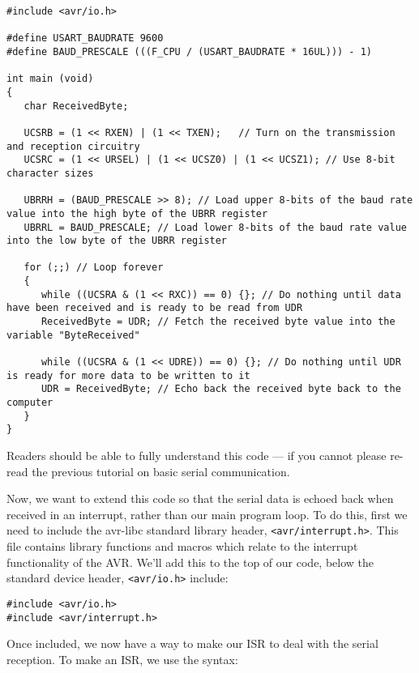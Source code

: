 \documentclass[a4paper,oneside,notitlepage]{book}
\begin{document}
\begin{center}
\begin{lstlisting}
#include <avr/io.h>

#define USART_BAUDRATE 9600
#define BAUD_PRESCALE (((F_CPU / (USART_BAUDRATE * 16UL))) - 1)

int main (void)
{
   char ReceivedByte;

   UCSRB = (1 << RXEN) | (1 << TXEN);   // Turn on the transmission and reception circuitry
   UCSRC = (1 << URSEL) | (1 << UCSZ0) | (1 << UCSZ1); // Use 8-bit character sizes

   UBRRH = (BAUD_PRESCALE >> 8); // Load upper 8-bits of the baud rate value into the high byte of the UBRR register
   UBRRL = BAUD_PRESCALE; // Load lower 8-bits of the baud rate value into the low byte of the UBRR register

   for (;;) // Loop forever
   {
      while ((UCSRA & (1 << RXC)) == 0) {}; // Do nothing until data have been received and is ready to be read from UDR
      ReceivedByte = UDR; // Fetch the received byte value into the variable "ByteReceived"

      while ((UCSRA & (1 << UDRE)) == 0) {}; // Do nothing until UDR is ready for more data to be written to it
      UDR = ReceivedByte; // Echo back the received byte back to the computer
   }
}
\end{lstlisting}
\end{center}

Readers should be able to fully understand this code --- if you cannot please re-read the previous tutorial on basic serial communication.

Now, we want to extend this code so that the serial data is echoed back when received in an interrupt, rather than our main program loop. To do this, first we need to include the avr-libc standard library header, \texttt{<avr/interrupt.h>}. This file contains library functions and macros which relate to the interrupt functionality of the AVR. We'll add this to the top of our code, below the standard device header, \texttt{<avr/io.h>}  include:

\begin{center}
\begin{lstlisting}
#include <avr/io.h>
#include <avr/interrupt.h>
\end{lstlisting}
\end{center}

Once included, we now have a way to make our ISR to deal with the serial reception. To make an ISR, we use the syntax:
\end{document}
